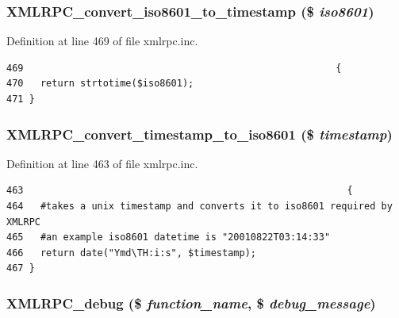 \hypertarget{xmlrpc_8inc_1d9c2ef61c9f1fd2723d06d1364ef845}{
\subsubsection{\setlength{\rightskip}{0pt plus 5cm}XMLRPC\_\-convert\_\-iso8601\_\-to\_\-timestamp (\$ {\em iso8601})}}
\label{xmlrpc_8inc_1d9c2ef61c9f1fd2723d06d1364ef845}




Definition at line 469 of file xmlrpc.inc.

\begin{Code}\begin{verbatim}469                                                       {
470   return strtotime($iso8601);
471 }
\end{verbatim}
\end{Code}


\hypertarget{xmlrpc_8inc_4485d809c5d598949d9cfaca42bddf37}{
\subsubsection{\setlength{\rightskip}{0pt plus 5cm}XMLRPC\_\-convert\_\-timestamp\_\-to\_\-iso8601 (\$ {\em timestamp})}}
\label{xmlrpc_8inc_4485d809c5d598949d9cfaca42bddf37}




Definition at line 463 of file xmlrpc.inc.

\begin{Code}\begin{verbatim}463                                                         {
464   #takes a unix timestamp and converts it to iso8601 required by XMLRPC
465   #an example iso8601 datetime is "20010822T03:14:33"
466   return date("Ymd\TH:i:s", $timestamp);
467 }
\end{verbatim}
\end{Code}


\hypertarget{xmlrpc_8inc_e2d2e97a8c1c560f5e96d58d60a02874}{
\subsubsection{\setlength{\rightskip}{0pt plus 5cm}XMLRPC\_\-debug (\$ {\em function\_\-name}, \$ {\em debug\_\-message})}}
\label{xmlrpc_8inc_e2d2e97a8c1c560f5e96d58d60a02874}




